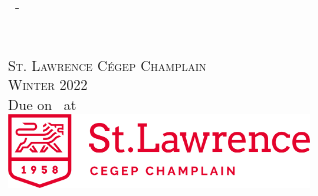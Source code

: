 \begin{titlepage}
	\begin{center}
		\vspace*{0.5in}
		\LARGE{\textsc{\docTitle}}\\
		\vspace*{0.1in}
		\Large{\textsc{\docSubTitle}}\\
		\vfill
		\Large{\textsc{\docAuthorTitlePage}}\\
		\vspace*{0.1in}
		\Large{\textsc{\docClass\ -\ \docClassNumber}}\\
		\vfill
		\Large{\docClassTime}\\
		\vspace*{0.1in}
		\large{\textsc{\docClassInstructor}}\\
		\vfill
		\large{\textsc{St. Lawrence Cégep Champlain}}\\
		\vspace*{0.1in}
		\normalsize{\textsc{Winter 2022}}\\
		\vspace*{0.1in}
		\small{Due on \docDueDate\ at \docDueTime}\\
		\vfill
		\includegraphics[width=0.6\textwidth]{../images/Title_page_logo.png}
		\vfill
	\end{center}
\end{titlepage}
\pagebreak